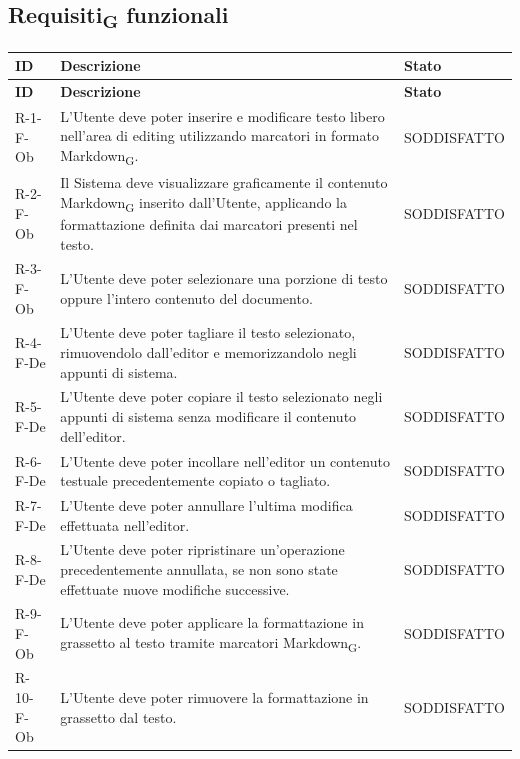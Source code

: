 \documentclass[a4paper, 10pt]{article}
\begin{document}
\subsection{Requisiti\textsubscript{G} funzionali}
\label{sec:tracciamento-funzionali}

\begin{longtable}{|p{2.1cm}|p{9.6cm}|p{2.6cm}|}
    \hline
    \rowcolor{gray!15}
    \textbf{ID} & \textbf{Descrizione} & \textbf{Stato} \\
    \hline
    \endfirsthead
    \hline
    \rowcolor{gray!15}
    \textbf{ID} & \textbf{Descrizione} & \textbf{Stato} \\
    \hline
    \endhead
    R-1-F-Ob & L'Utente deve poter inserire e modificare testo libero nell'area di editing utilizzando marcatori in formato Markdown\textsubscript{G}. & SODDISFATTO \\ \hline
    R-2-F-Ob & Il Sistema deve visualizzare graficamente il contenuto Markdown\textsubscript{G} inserito dall'Utente, applicando la formattazione definita dai marcatori presenti nel testo. & SODDISFATTO \\ \hline
    R-3-F-Ob & L'Utente deve poter selezionare una porzione di testo oppure l'intero contenuto del documento. & SODDISFATTO \\ \hline
    R-4-F-De & L'Utente deve poter tagliare il testo selezionato, rimuovendolo dall'editor e memorizzandolo negli appunti di sistema. & SODDISFATTO \\ \hline
    R-5-F-De & L'Utente deve poter copiare il testo selezionato negli appunti di sistema senza modificare il contenuto dell'editor. & SODDISFATTO \\ \hline
    R-6-F-De & L'Utente deve poter incollare nell'editor un contenuto testuale precedentemente copiato o tagliato. & SODDISFATTO \\ \hline
    R-7-F-De & L'Utente deve poter annullare l'ultima modifica effettuata nell'editor. & SODDISFATTO \\ \hline
    R-8-F-De & L'Utente deve poter ripristinare un'operazione precedentemente annullata, se non sono state effettuate nuove modifiche successive. & SODDISFATTO \\ \hline
    R-9-F-Ob & L'Utente deve poter applicare la formattazione in grassetto al testo tramite marcatori Markdown\textsubscript{G}. & SODDISFATTO \\ \hline
    R-10-F-Ob & L'Utente deve poter rimuovere la formattazione in grassetto dal testo. & SODDISFATTO \\ \hline

\end{longtable}
\end{document}
